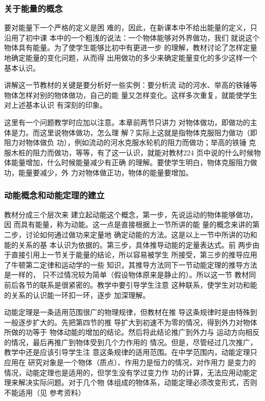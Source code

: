 \subsubsection{关于能量的概念}

要对能量下一个严格的定义是困
难的，因此，在新课本中不给出能量的定义，只沿用了初中课
本中的一个粗浅的说法：一个物体能够对外界做功，我们
就说这个物体具有能量。为了使学生能够比初中有更进一步
的理解，教材讨论了怎样定量地确定能量的变化问题，从而得
出用做功的多少来确定能量变化的多少这样一个基本认识。

讲解这一节教材的关键是要分析好一些实例：要分析流
动的河水、举高的铁锤等物体怎样对别的物体做功，自己的能
量又怎样变化。这样多次重复，就能使学生对上述基本认识
有深刻的印象。

这里有一个问题教学时应加以注意。本章前两节只讲力
对物体做功，即做功的主体是力。而这里说物体做功，怎么理
解？实际上这就是指物体克服阻力做功（即阻力对物体做负
功），例如流动的河水克服水轮机的阻力而做功；举高的铁锤
克服木桩的阻力而做功，等等，有了这一认识，就能对教材224
页中说的什么时候物体能量增加，什么时候能量减少有正确
的理解。要使学生明白，物体克服阻力做功，能量要减少，外
力对物体做正功，物体的能量要增加。

\subsubsection{动能概念和动能定理的建立}

教材分成三个层次来
建立起动能这个概念，第一步，先说运动的物体能够做功，因
而具有能量，称为动能。这一点是直接根据上一节所讲的能
量的概念来讲的第二步，讨论如何通过做功来定量地
确定动能的方法。这是以上一节中所讲的功和能的关系的基
本认识为依据的。第三步，具体推导动能的定量表达式。前
两步由于直接引用上一节关于能量的结论，所以容易被学生
所接受，第三步的推导应用了牛顿第二定律和运动学的一些
知识，其推导方法同下一节动能定理的推导方法是一样的，
只不过情况较为简单（假设物体原来是静止的）。所以这一节
教材同前后各节的联系是很紧密的。教学中要引导学生注意
这种联系，使学生对功和能的关系的认识能一环扣一环，逐步
加深理解。

动能定理是一条适用范围很广的物理规律，但教材在推
导这条规律时是由特殊到一般逐步扩大的。先把第四节的推
导扩大到初速不为零的情况，得到外力对物体所做的功等于
物体动能的增加的结论。然后将此结论推广到外力与
运动方向相反的情况，最后再推广到物体受到几个力作用的
情况。但是，尽管经过几次推广，教学中还是应该引导学生注
意这条规律的适用范围。在中学范围内，动能定理只应用在
研究对象是一个物体（质点）、作用力是恒力的情况，对作用力
是变力的情况，动能定理也是适用的，但学生没有学过变力作
功的计算，无法应用动能定理来解决实际问题。对于几个物
体组成的物体系，动能定理必须改变形式，否则不能适用（见
参考资料）

